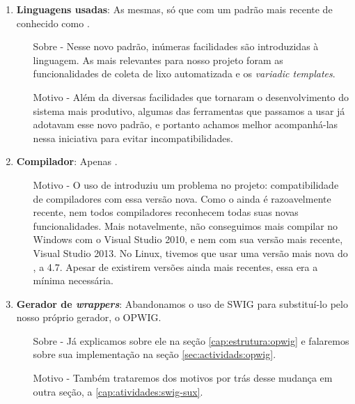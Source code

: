   \begin{enumerate}

    \item \textbf{Linguagens usadas}: As mesmas, só que com um padrão mais
      recente de \CXX{} conhecido como .
      \begin{itemize}
        \item[Sobre -] Nesse novo padrão, inúmeras facilidades são
          introduzidas à linguagem. As mais relevantes para nosso projeto
          foram as funcionalidades de coleta de lixo automatizada e
          os \textit{variadic templates}.
        \item[Motivo -] Além da diversas facilidades que tornaram o
          desenvolvimento do sistema mais produtivo, algumas das
          ferramentas que passamos a usar já adotavam esse novo padrão,
          e portanto achamos melhor acompanhá-las nessa iniciativa para
          evitar incompatibilidades.
      \end{itemize}

    \item \textbf{Compilador}: Apenas .
      \begin{itemize}
        \item[Motivo -] O uso de  introduziu um problema no projeto:
          compatibilidade de compiladores com essa versão nova. Como o 
          ainda é razoavelmente recente, nem todos compiladores reconhecem
          todas suas novas funcionalidades. Mais notavelmente, não conseguimos
          mais compilar no Windows com o Visual Studio 2010, e nem com sua
          versão mais recente, Visual Studio 2013. No Linux, tivemos que usar
          uma versão mais nova do , a 4.7. Apesar de existirem
          versões ainda mais recentes, essa era a mínima necessária.
      \end{itemize}

    \item \textbf{Gerador de \textit{wrappers}}: Abandonamos o uso de SWIG
      para substituí-lo pelo nosso próprio gerador, o OPWIG.
      \begin{itemize}
        \item[Sobre -] Já explicamos sobre ele na seção \ref{cap:estrutura:opwig}
          e falaremos sobre sua implementação na seção \ref{sec:actividads:opwig}.
        \item[Motivo -] Também trataremos dos motivos por trás desse mudança
          em outra seção, a \ref{cap:atividades:swig-sux}.
      \end{itemize}


\end{enumerate}
